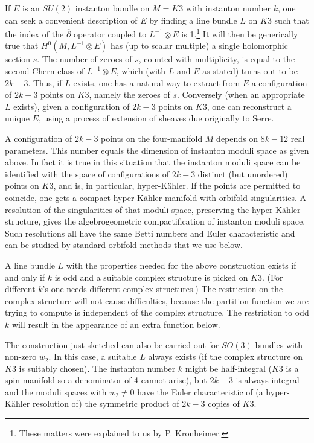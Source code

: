 \documentclass[12pt]{article}
\numberwithin{equation}{section}
\def\bar{\overline}
\begin{document}
If $E$ is an $SU(2)$ instanton bundle on $M=K3$ with instanton number $k$,
one can
seek \cite{mukai,others} a convenient description of
$E$ by finding a line bundle
$L$ on $K3$ such that the index of the $\bar\partial $ operator
coupled to $L^{-1}\otimes E$ is   1.\footnote{These matters were
explained to us by P. Kronheimer.}  It will then be generically
true that $H^0(M,L^{-1}\otimes E)$ has (up to scalar multiple) a single
holomorphic section $s$.  The number of zeroes of $s$, counted with
multiplicity, is equal to the second Chern class of $L^{-1}\otimes E$,
which (with $L$ and $E$ as stated) turns out to be $2k-3$.  Thus, if $L$
exists,
one has a natural way to extract from $E$  a configuration of $2k-3$
points on $K3$, namely the zeroes of $s$.
Conversely (when an appropriate $L$ exists), given
a configuration of $2k-3$ points on $K3$, one can reconstruct a unique
$E$, using a process of extension of sheaves due originally to Serre.

A configuration of $2k-3$ points on the four-manifold $M$ depends on
$8k-12$ real parameters.  This number equals the dimension of instanton
moduli space as given above.  In fact it is true in this situation
that the instanton moduli space can be identified with the space of
configurations of $2k-3$ distinct (but unordered) points on $K3$, and is,
in particular, hyper-K\"ahler.  If the points
are permitted to coincide, one gets a compact  hyper-K\"ahler
manifold with orbifold singularities.
A resolution of the singularities of that moduli space, preserving
the hyper-K\"ahler structure, gives the
algebrogeometric compactification of instanton moduli space.
Such resolutions  all have the same Betti numbers and Euler
characteristic and  can be studied by standard orbifold methods that we use
below.

A line bundle $L$ with the properties needed for the above construction
exists if and only if $k$ is odd and a suitable complex structure is
picked on $K3$.  (For different $k$'s one needs different complex structures.)
The restriction on the complex structure will not cause difficulties,
because the partition function we are trying to compute is independent
of the complex structure.  The restriction to odd $k$ will result
in the appearance of an extra function below.

The construction just sketched can also be carried out for $SO(3)$
bundles with non-zero $w_2$.  In this case, a suitable $L$ always
exists (if the complex structure on $K3$ is suitably chosen).  The
instanton number $k$ might be half-integral ($K3$ is a spin manifold
so a denominator of 4 cannot arise), but $2k-3$ is always integral
and the moduli spaces with $w_2\not=0$ have the Euler characteristic
of (a hyper-K\"ahler resolution of)
the symmetric product of $2k-3$ copies of $K3$.
\end{document}
